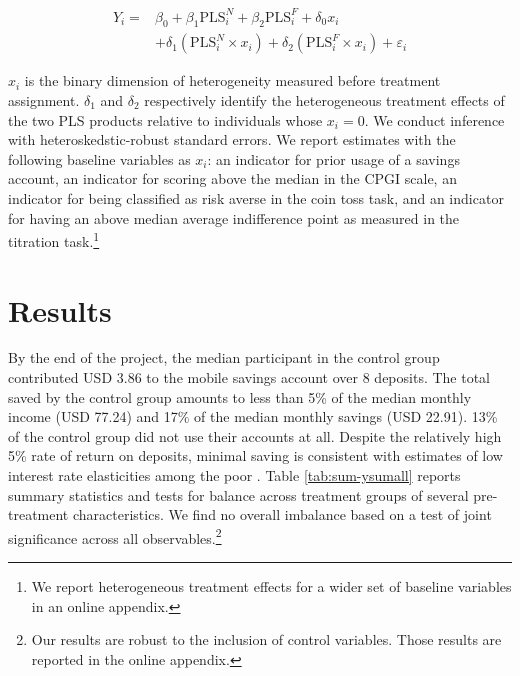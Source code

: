 \documentclass[12pt, titlepage]{article}
\begin{document}
		\begin{equation} \begin{split}
		Y_{i} = & \beta_{0} + \beta_{1}\text{PLS}^{N}_{i} + \beta_{2}\text{PLS}^{F}_{i} + \delta_{0}x_{i} \\
					& + \delta_{1}(\text{PLS}^{N}_{i} \times x_{i}) + \delta_{2}(\text{PLS}^{F}_{i} \times x_{i}) + \varepsilon_{i}
		\end{split} \label{eq:heteffect} \end{equation}

		$x_{i}$ is the binary dimension of heterogeneity measured before treatment assignment. $\delta_{1}$ and $\delta_{2}$ respectively identify the heterogeneous treatment effects of the two PLS products relative to individuals whose $x_{i} = 0$. We conduct inference with heteroskedstic-robust standard errors. We report estimates with the following baseline variables as $x_{i}$: an indicator for prior usage of a savings account, an indicator for scoring above the median in the CPGI scale, an indicator for being classified as risk averse in the coin toss task, and an indicator for having an above median average indifference point as measured in the titration task.\footnote{We report heterogeneous treatment effects for a wider set of baseline variables in an online appendix.}

\section{Results} \label{sec:results}

	By the end of the project, the median participant in the control group contributed USD 3.86 to the mobile savings account over 8 deposits. The total saved by the control group amounts to less than 5\% of the median monthly income (USD 77.24) and 17\% of the median monthly savings (USD 22.91). 13\% of the control group did not use their accounts at all. Despite the relatively high 5\% rate of return on deposits, minimal saving is consistent with estimates of low interest rate elasticities among the poor \parencite{karlan_price_2018}. Table \ref{tab:sum-ysumall} reports summary statistics and tests for balance across treatment groups of several pre-treatment characteristics. We find no overall imbalance based on a test of joint significance across all observables.\footnote{Our results are robust to the inclusion of control variables. Those results are reported in the online appendix.}

	
\end{document}

